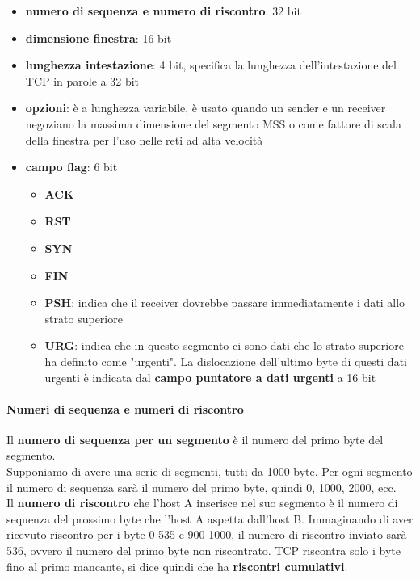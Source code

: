 \documentclass[11pt,a4paper]{article}
\begin{document}
\begin{itemize}
	\item \textbf{numero di sequenza e numero di riscontro}: 32 bit
	\item \textbf{dimensione finestra}: 16 bit
	\item \textbf{lunghezza intestazione}: 4 bit, specifica la lunghezza dell'intestazione del TCP in parole a 32 bit
	\item \textbf{opzioni}: è a lunghezza variabile, è usato quando un sender e un receiver negoziano la massima dimensione del segmento MSS o come fattore di scala della finestra per l'uso nelle reti ad alta velocità
	\item \textbf{campo flag}: 6 bit
		\begin{itemize}
			\item \textbf{ACK}
			\item \textbf{RST}
			\item \textbf{SYN}
			\item \textbf{FIN}
			\item \textbf{PSH}: indica che il receiver dovrebbe passare immediatamente i dati allo strato superiore
			\item \textbf{URG}: indica che in questo segmento ci sono dati che lo strato superiore ha definito come "urgenti". La dislocazione dell'ultimo byte di questi dati urgenti è indicata dal \textbf{campo puntatore a dati urgenti} a 16 bit
		\end{itemize}
\end{itemize}
\paragraph{Numeri di sequenza e numeri di riscontro}
Il \textbf{numero di sequenza per un segmento} è il numero del primo byte del segmento. \\
Supponiamo di avere una serie di segmenti, tutti da 1000 byte. Per ogni segmento il numero di sequenza sarà il numero del primo byte, quindi 0, 1000, 2000, ecc.\\
Il \textbf{numero di riscontro} che l'host A inserisce nel suo segmento è il numero di sequenza del prossimo byte che l'host A aspetta dall'host B. Immaginando di aver ricevuto riscontro per i byte 0-535 e 900-1000, il numero di riscontro inviato sarà 536, ovvero il numero del primo byte non riscontrato. TCP riscontra solo i byte fino al primo mancante, si dice quindi che ha \textbf{riscontri cumulativi}. \\
\end{document}
